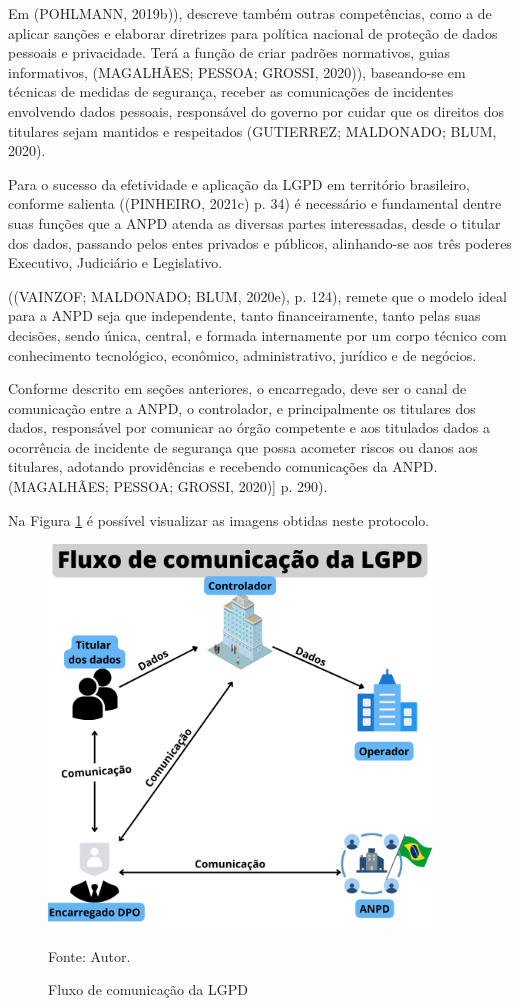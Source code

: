 \documentclass[
	12pt,				%
	openright,			%
	oneside,			%
	a4paper,			%
	english,			%
	french,				%
	spanish,			%
	brazil,				%
	]{abntex2}
\begin{document}
Em (POHLMANN, 2019b)), descreve também outras competências, como a de aplicar sanções e elaborar diretrizes para política nacional de proteção de dados pessoais e privacidade. Terá a função de criar padrões normativos, guias informativos,      (MAGALHÃES; PESSOA; GROSSI, 2020)), baseando-se em técnicas de medidas de segurança, receber as comunicações de incidentes envolvendo dados pessoais, responsável do governo por cuidar que os direitos dos titulares sejam mantidos e respeitados (GUTIERREZ; MALDONADO; BLUM, 2020).

Para o sucesso da efetividade e aplicação da LGPD em território brasileiro, conforme salienta ((PINHEIRO, 2021c) p. 34) é necessário e fundamental dentre suas funções que a ANPD atenda as diversas partes interessadas, desde o titular dos dados, passando pelos entes privados e públicos, alinhando-se aos três poderes Executivo, Judiciário e Legislativo.

((VAINZOF; MALDONADO; BLUM, 2020e), p. 124), remete que o modelo ideal para a ANPD seja que independente, tanto financeiramente, tanto pelas suas decisões, sendo única, central, e formada internamente por um corpo técnico com conhecimento tecnológico, econômico, administrativo, jurídico e de negócios.

Conforme descrito em seções anteriores, o encarregado, deve ser o canal de comunicação entre a ANPD, o controlador, e principalmente os titulares dos dados, responsável por comunicar ao órgão competente e aos titulados dados a ocorrência de incidente de segurança que possa acometer riscos ou danos aos titulares, adotando providências e recebendo comunicações da ANPD. (MAGALHÃES; PESSOA; GROSSI, 2020)] p. 290).

Na Figura \ref{fig: Fluxo } é possível visualizar as imagens obtidas neste protocolo.
\begin{figure}[ht]
    \centering
    \caption{Fluxo de comunicação da LGPD}
    \includegraphics[width=4.0in]{Images/04FluxoLGPD.png}
    
    \label{fig: Fluxo }
    \centering \small Fonte: Autor.
\end{figure}
\end{document}
